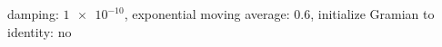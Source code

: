 damping: $\num[scientific-notation=true]{1e-10}$, exponential moving average: $\num[scientific-notation=true]{0.6}$, initialize Gramian to identity: $\text{no}$